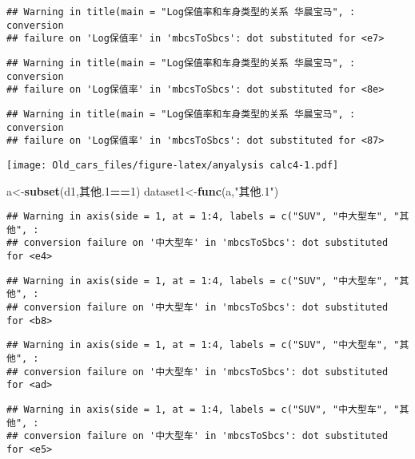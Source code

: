 \documentclass[]{article}
\newenvironment{Shaded}{\begin{snugshade}}{\end{snugshade}}
\newcommand{\KeywordTok}[1]{\textcolor[rgb]{0.13,0.29,0.53}{\textbf{#1}}}
\newcommand{\DecValTok}[1]{\textcolor[rgb]{0.00,0.00,0.81}{#1}}
\newcommand{\StringTok}[1]{\textcolor[rgb]{0.31,0.60,0.02}{#1}}
\newcommand{\OperatorTok}[1]{\textcolor[rgb]{0.81,0.36,0.00}{\textbf{#1}}}
\newcommand{\NormalTok}[1]{#1}
\begin{document}
\begin{verbatim}
## Warning in title(main = "Log保值率和车身类型的关系 华晨宝马", : conversion
## failure on 'Log保值率' in 'mbcsToSbcs': dot substituted for <e7>
\end{verbatim}

\begin{verbatim}
## Warning in title(main = "Log保值率和车身类型的关系 华晨宝马", : conversion
## failure on 'Log保值率' in 'mbcsToSbcs': dot substituted for <8e>
\end{verbatim}

\begin{verbatim}
## Warning in title(main = "Log保值率和车身类型的关系 华晨宝马", : conversion
## failure on 'Log保值率' in 'mbcsToSbcs': dot substituted for <87>
\end{verbatim}

\texttt{[image: Old\_cars\_files/figure-latex/anyalysis calc4-1.pdf]}

\begin{Shaded}
\begin{Highlighting}[]
\NormalTok{a<-}\KeywordTok{subset}\NormalTok{(d1,其他.}\DecValTok{1}\OperatorTok{==}\DecValTok{1}\NormalTok{)}
\NormalTok{dataset1<-}\KeywordTok{func}\NormalTok{(a,}\StringTok{"其他.1"}\NormalTok{)}
\end{Highlighting}
\end{Shaded}

\begin{verbatim}
## Warning in axis(side = 1, at = 1:4, labels = c("SUV", "中大型车", "其他", :
## conversion failure on '中大型车' in 'mbcsToSbcs': dot substituted for <e4>
\end{verbatim}

\begin{verbatim}
## Warning in axis(side = 1, at = 1:4, labels = c("SUV", "中大型车", "其他", :
## conversion failure on '中大型车' in 'mbcsToSbcs': dot substituted for <b8>
\end{verbatim}

\begin{verbatim}
## Warning in axis(side = 1, at = 1:4, labels = c("SUV", "中大型车", "其他", :
## conversion failure on '中大型车' in 'mbcsToSbcs': dot substituted for <ad>
\end{verbatim}

\begin{verbatim}
## Warning in axis(side = 1, at = 1:4, labels = c("SUV", "中大型车", "其他", :
## conversion failure on '中大型车' in 'mbcsToSbcs': dot substituted for <e5>
\end{verbatim}
\end{document}

